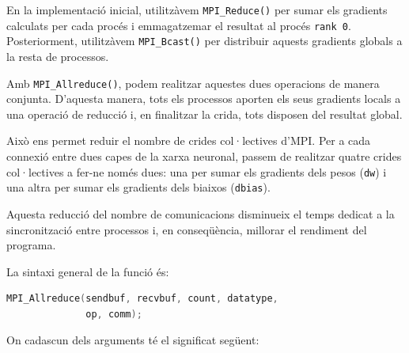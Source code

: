 \documentclass{article}
\begin{document}
En la implementació inicial, utilitzàvem
\texttt{MPI\_Reduce()} per sumar els gradients calculats
per cada procés i emmagatzemar el resultat al procés
\texttt{rank 0}. Posteriorment, utilitzàvem
\texttt{MPI\_Bcast()} per distribuir aquests gradients
globals a la resta de processos.

Amb \texttt{MPI\_Allreduce()}, podem realitzar aquestes
dues operacions de manera conjunta. D'aquesta manera,
tots els processos aporten els seus gradients locals
a una operació de reducció i, en finalitzar la crida,
tots disposen del resultat global.

Això ens permet reduir el nombre de crides col·lectives
d'MPI. Per a cada connexió entre dues capes
de la xarxa neuronal, passem de realitzar quatre
crides col·lectives a fer-ne només dues:
una per sumar els gradients dels pesos
(\texttt{dw}) i una altra per sumar els gradients
dels biaixos (\texttt{dbias}).

Aquesta reducció del nombre de comunicacions
disminueix el temps dedicat a la sincronització
entre processos i, en conseqüència, millorar
el rendiment del programa.

\medskip

La sintaxi general de la funció és:

\begin{lstlisting}[language=C]
MPI_Allreduce(sendbuf, recvbuf, count, datatype,
              op, comm);
\end{lstlisting}

\noindent On cadascun dels arguments té el significat següent:
\end{document}
